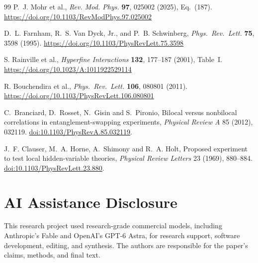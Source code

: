 \documentclass[11pt]{article}
\theoremstyle{definition}
\theoremstyle{remark}
\theoremstyle{plain}
\begin{document}
{\begin{thebibliography}{99}
P.~J. Mohr et al., \emph{Rev. Mod. Phys.} \textbf{97}, 025002 (2025),
Eq.~(187). \url{https://doi.org/10.1103/RevModPhys.97.025002}

D.~L. Farnham, R.~S. Van Dyck, Jr., and P.~B. Schwinberg,
\emph{Phys.\ Rev.\ Lett.} \textbf{75}, 3598 (1995).
\url{https://doi.org/10.1103/PhysRevLett.75.3598}

S. Rainville et al., \emph{Hyperfine Interactions} \textbf{132},
177--187 (2001), Table~I.
\url{https://doi.org/10.1023/A:1011922529114}

R. Bouchendira et al., \emph{Phys.\ Rev.\ Lett.} \textbf{106}, 080801
(2011). \url{https://doi.org/10.1103/PhysRevLett.106.080801}



C.~Branciard, D.~Rosset, N.~Gisin and S.~Pironio,
Bilocal versus nonbilocal correlations in entanglement-swapping experiments,
\emph{Physical Review A} 85 (2012), 032119.
\href{https://doi.org/10.1103/PhysRevA.85.032119}{doi:10.1103/PhysRevA.85.032119}.

J.~F. Clauser, M.~A. Horne, A.~Shimony and R.~A. Holt,
Proposed experiment to test local hidden-variable theories,
\emph{Physical Review Letters} 23 (1969), 880--884.
\href{https://doi.org/10.1103/PhysRevLett.23.880}{doi:10.1103/PhysRevLett.23.880}.

\end{thebibliography}}

\section*{AI Assistance Disclosure}
This research project used research-grade commercial models, including
Anthropic's Fable and OpenAI's GPT-6 Astra, for research support, software
development, editing, and synthesis. The authors are responsible for the
paper's claims, methods, and final text.
\end{document}

